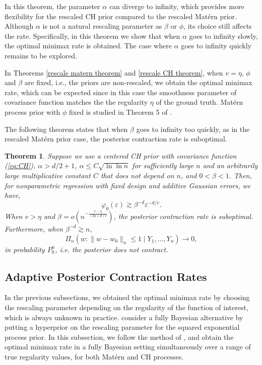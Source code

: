 \documentclass[ejs,noshowframe]{imsart}
\theoremstyle{plain}
\newtheorem{theorem}{Theorem}[section]
\theoremstyle{definition}
\theoremstyle{remark}
\begin{document}
In this theorem, the parameter $\alpha$ can   diverge to infinity, which provides more flexibility  for the rescaled CH prior compared to the rescaled Mat\'ern prior. Although $\alpha$ is not a natural rescaling parameter as $\beta$ or $\phi$, its choice still affects the rate. Specifically, in this theorem  we   show that  when  $\alpha$ goes to infinity slowly, the  optimal minimax rate is obtained. The case where $\alpha$ goes to infinity quickly remains to be explored. 

In  Theorems \ref{rescale matern theorem} and \ref{rescale CH theorem}, when   $v=\eta$,  $\phi$ and $\beta$ are  fixed, i.e., the priors are non-rescaled,  we obtain the optimal minimax rate,  which can be expected since in this case the smoothness parameter of covariance function matches the the regularity $\eta$ of the ground truth. Mat\'ern process prior  with $\phi$ fixed is studied in  Theorem 5 of  \cite{van2011information}.

   The following theorem states that when $\beta$ goes to infinity too quickly, as in the rescaled Mat\'ern prior case, the posterior contraction rate is suboptimal. 
\begin{theorem}
Suppose we use a centered CH prior with  covariance function  (\ref{eq:CH}),  $\alpha>d/2+1$, $\alpha \leq C \sqrt{\ln \ln{n}}$  for sufficiently large $n$ and an arbitrarily large multiplicative constant $C$ that  does not depend on $n$, and $0<\beta<1$.   Then, for nonparametric regression with fixed design and additive Gaussian errors, we have,
$$
  \varphi_0(\varepsilon )\gtrsim \beta^{-d} \varepsilon^{-d/v}.
$$
When $v>\eta$ and  $\beta=o(n^{-\frac{v-\eta}{(2\eta+d)v}})$, the posterior contraction rate is suboptimal. Furthermore, when $\beta^{-d} \gtrsim n$, 
$$
 \Pi_n(w:\|w-w_0\|_n \leq 1 \mid Y_1,\ldots,Y_n)  \to 0,
$$
in probability $P_0^n$, i.e. the posterior does not contract.
\label{lower bound of rescaled CH}
\end{theorem}

\subsection{Adaptive Posterior Contraction Rates}\label{section3.4}
In the previous subsections, we obtained the optimal minimax rate by  choosing the rescaling parameter depending on the regularity of the function of interest, which is always unknown in practice.  \cite{van2009adaptive} consider a fully Bayesian alternative by putting a hyperprior on the rescaling parameter for the squared exponential process prior.  In this subsection, we follow the method of \cite{van2009adaptive}, and  obtain the optimal minimax rate
in a fully Bayesian setting simultaneously over a range of true regularity values,  for both Mat\'ern and CH processes.
\end{document}
